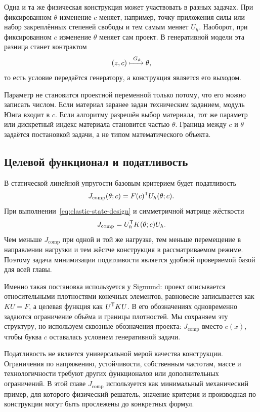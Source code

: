 Одна и та же физическая конструкция может участвовать в разных задачах. При фиксированном $\theta$ изменение $c$ меняет, например, точку приложения силы или набор закреплённых степеней свободы и тем самым меняет $U_h$. Наоборот, при фиксированном $c$ изменение $\theta$ меняет сам проект. В генеративной модели эта разница станет контрактом
\begin{equation}
 (z,c)\xmapsto{\ G_\phi }\theta,
\end{equation}
то есть условие передаётся генератору, а конструкция является его выходом.

Параметр не становится проектной переменной только потому, что его можно записать числом. Если материал заранее задан техническим заданием, модуль Юнга входит в $c$. Если алгоритму разрешён выбор материала, тот же параметр или дискретный индекс материала становится частью $\theta$. Граница между $c$ и $\theta$ задаётся постановкой задачи, а не типом математического объекта.

\subsection{Целевой функционал и податливость}

В статической линейной упругости базовым критерием будет податливость
\begin{equation}
 J_{\mathrm{comp}}(\theta;c)
 =F(c)^{\mathsf{T}}U_h(\theta;c).
\end{equation}
При выполнении~\eqref{eq:elastic-state-design} и симметричной матрице жёсткости
\begin{equation}
 J_{\mathrm{comp}}
 =U_h^{\mathsf{T}}K(\theta;c)U_h.
\end{equation}
Чем меньше $J_{\mathrm{comp}}$ при одной и той же нагрузке, тем меньше перемещение в направлении нагрузки и тем жёстче конструкция в рассматриваемом режиме. Поэтому задача минимизации податливости является удобной проверяемой базой для всей главы.

Именно такая постановка используется у Sigmund: проект описывается относительными плотностями конечных элементов, равновесие записывается как $KU=F$, а целевая функция как $U^{\mathsf{T}}KU$. В его обозначениях одновременно задаются ограничение объёма и границы плотностей. Мы сохраняем эту структуру, но используем сквозные обозначения проекта: $J_{\mathrm{comp}}$ вместо $c(x)$, чтобы буква $c$ оставалась условием генеративной задачи.

Податливость не является универсальной мерой качества конструкции. Ограничения по напряжению, устойчивости, собственным частотам, массе и технологичности требуют других функционалов или дополнительных ограничений. В этой главе $J_{\mathrm{comp}}$ используется как минимальный механический пример, для которого физический решатель, значение критерия и производная по конструкции могут быть прослежены до конкретных формул.

